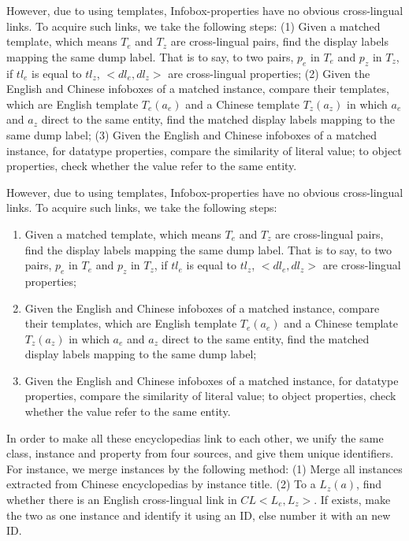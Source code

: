 \documentclass[runningheads,a4paper]{llncs}
\begin{document}
However, due to using templates, Infobox-properties have no obvious cross-lingual links. To acquire such links, we take the following steps: (1) Given a matched template, which means $T_{e}$ and $T_{z}$ are cross-lingual pairs, find the display labels mapping the same dump label. That is to say, to two pairs, $p_{e}$ in $T_{e}$ and $p_{z}$ in $T_{z}$, if $tl_{e}$ is equal to $tl_{z}$, $<dl_{e},dl_{z}>$ are cross-lingual properties; (2) Given the English and Chinese infoboxes of a matched instance, compare their templates, which are English template $T_{e}(a_{e})$ and a Chinese template $T_{z}(a_{z})$ in which $a_{e}$ and $a_{z}$ direct to the same entity, find the matched display labels mapping to the same dump label; (3) Given the English and Chinese infoboxes of a matched instance, for datatype properties, compare the similarity of literal value; to object properties, check whether the value refer to the same entity.

However, due to using templates, Infobox-properties have no obvious cross-lingual links. To acquire such links, we take the following steps:
\begin{enumerate}[1)]
    \item Given a matched template, which means $T_{e}$ and $T_{z}$ are cross-lingual pairs, find the display labels mapping the same dump label. That is to say, to two pairs, $p_{e}$ in $T_{e}$ and $p_{z}$ in $T_{z}$, if $tl_{e}$ is equal to $tl_{z}$, $<dl_{e},dl_{z}>$ are cross-lingual properties;
    \item Given the English and Chinese infoboxes of a matched instance, compare their templates, which are English template $T_{e}(a_{e})$ and a Chinese template $T_{z}(a_{z})$ in which $a_{e}$ and $a_{z}$ direct to the same entity, find the matched display labels mapping to the same dump label;
    \item Given the English and Chinese infoboxes of a matched instance, for datatype properties, compare the similarity of literal value; to object properties, check whether the value refer to the same entity.
\end{enumerate}

In order to make all these encyclopedias link to each other, we unify the same class, instance and property from four sources, and give them unique identifiers. For instance, we merge instances by the following method: (1) Merge all instances extracted from Chinese encyclopedias by instance title. (2) To a $L_{z}(a)$, find whether there is an English cross-lingual link in $CL<L_{e}, L_{z}>$. If exists, make the two as one instance and identify it using an ID, else number it with an new ID.
\end{document}
